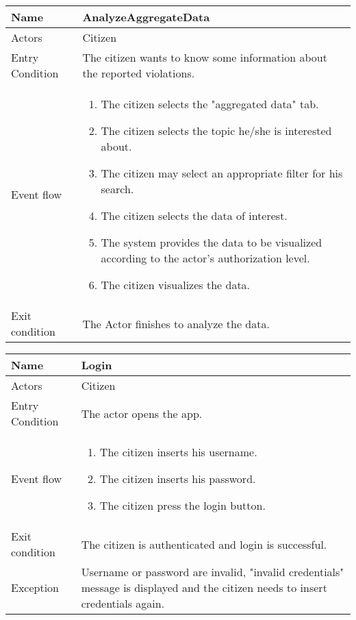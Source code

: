 \vskip 0.2in
\begin{tabular}{|p{3.7cm}|p{11cm}|}
\hline
Name & AnalyzeAggregateData\\
\hline
Actors & Citizen\\
\hline
Entry Condition & The citizen wants to know some information about the reported violations.\\
\hline
Event flow & \begin{enumerate}
                \item The citizen selects the "aggregated data" tab.
                \item The citizen selects the topic he/she is interested about.
                \item The citizen may select an appropriate filter for his search.
                \item The citizen selects the data of interest.
                \item The system provides the data to be visualized according to the actor's authorization level.
                \item The citizen visualizes the data.
            \end{enumerate}\\
\hline
Exit condition & The Actor finishes to analyze the data.\\
\hline
\end{tabular}

\vskip 0.2in
\begin{tabular}{|p{3.7cm}|p{11cm}|}
\hline
Name & Login\\
\hline
Actors & Citizen\\
\hline
Entry Condition & The actor opens the app.\\
\hline
Event flow & \begin{enumerate}
                \item The citizen inserts his username.
                \item The citizen inserts his password.
                \item The citizen press the login button.
            \end{enumerate}\\
\hline
Exit condition & The citizen is authenticated and login is successful.\\
\hline
Exception & Username or password are invalid, "invalid credentials" message is displayed and the citizen needs to insert credentials again.\\
\hline
\end{tabular}

